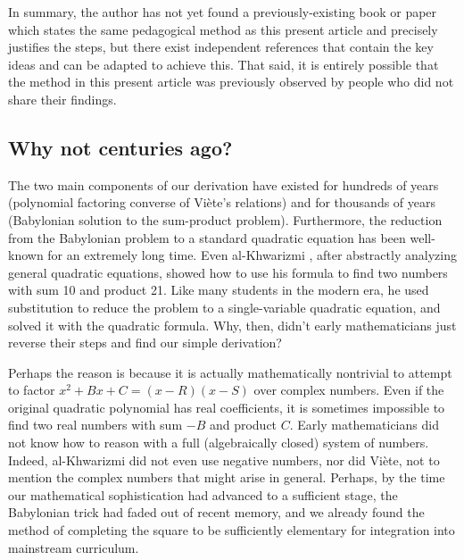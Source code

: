 \documentclass[11pt]{article}
\begin{document}
In summary, the author has not yet found a previously-existing book or paper
which states the same pedagogical method as this present article and precisely
justifies the steps, but there exist independent references that contain the
key ideas and can be adapted to achieve this. That said, it is entirely
possible that the method in this present article was previously observed by
people who did not share their findings.


\subsection{Why not centuries ago?}

The two main components of our derivation have existed for hundreds of years
(polynomial factoring converse of Vi\`ete's relations) and for thousands of
years (Babylonian solution to the sum-product problem). Furthermore, the
reduction from the Babylonian problem to a standard quadratic equation has been
well-known for an extremely long time.  Even al-Khwarizmi \cite{al-khwarizmi},
after abstractly analyzing general quadratic equations, showed how to use his
formula to find two numbers with sum 10 and product 21. Like many students in
the modern era, he used substitution to reduce the problem to a single-variable
quadratic equation, and solved it with the quadratic formula. Why, then, didn't
early mathematicians just reverse their steps and find our simple derivation?

Perhaps the reason is because it is actually mathematically nontrivial to
attempt to factor $x^2 + Bx + C = (x - R)(x - S)$ over complex numbers.  Even if
the original quadratic polynomial has real coefficients, it is sometimes
impossible to find two real numbers with sum $-B$ and product $C$.  Early
mathematicians did not know how to reason with a full (algebraically closed)
system of numbers. Indeed, al-Khwarizmi did not even use negative numbers, nor
did Vi\`ete, not to mention the complex numbers that might arise in general.
Perhaps, by the time our mathematical sophistication had advanced to a
sufficient stage, the Babylonian trick had faded out of recent memory, and we
already found the method of completing the square to be sufficiently elementary
for integration into mainstream curriculum.
\end{document}
